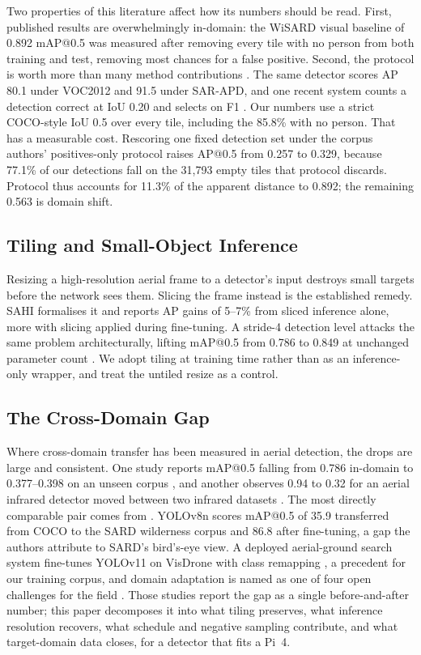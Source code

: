 \documentclass[conference]{IEEEtran}
\begin{document}
Two properties of this literature affect how its numbers should be read. First,
published results are overwhelmingly in-domain: the WiSARD visual baseline of
0.892 mAP@0.5 was measured after removing every tile with no person from both
training and test, removing most chances for a false positive. Second, the
protocol is worth more than many method contributions \cite{manzini2023}. The
same detector scores AP 80.1 under VOC2012 and 91.5 under SAR-APD, and one
recent system counts a detection correct at IoU 0.20 and selects on F1
\cite{fraternali2025}. Our numbers use a strict COCO-style IoU 0.5 over every
tile, including the 85.8\% with no person. That has a measurable cost. Rescoring
one fixed detection set under the corpus authors' positives-only protocol raises
AP@0.5 from 0.257 to 0.329, because 77.1\% of our detections fall on the 31,793
empty tiles that protocol discards. Protocol thus accounts for 11.3\% of the
apparent distance to 0.892; the remaining 0.563 is domain shift.

\subsection{Tiling and Small-Object Inference}

Resizing a high-resolution aerial frame to a detector's input destroys small
targets before the network sees them. Slicing the frame instead is the
established remedy. SAHI \cite{akyon2022} formalises it and reports AP gains of
5--7\% from sliced inference alone, more with slicing applied during
fine-tuning. A stride-4 detection level attacks the same problem
architecturally, lifting mAP@0.5 from 0.786 to 0.849 at unchanged parameter
count \cite{chen2026}. We adopt tiling at training time rather than as an
inference-only wrapper, and treat the untiled resize as a control.

\subsection{The Cross-Domain Gap}

Where cross-domain transfer has been measured in aerial detection, the drops are
large and consistent. One study reports mAP@0.5 falling from 0.786 in-domain to
0.377--0.398 on an unseen corpus \cite{chen2026}, and another observes 0.94 to
0.32 for an aerial infrared detector moved between two infrared datasets
\cite{song2025}. The most directly comparable pair comes from
\cite{sambolek2024}. YOLOv8n scores mAP@0.5 of 35.9 transferred from COCO to the
SARD wilderness corpus and 86.8 after fine-tuning, a gap the authors attribute
to SARD's bird's-eye view. A deployed aerial-ground search system fine-tunes
YOLOv11 on VisDrone with class remapping \cite{farrell2025}, a precedent for our
training corpus, and domain adaptation is named as one of four open challenges
for the field \cite{zhang2025}. Those studies report the gap as a single
before-and-after number; this paper decomposes it into what tiling preserves,
what inference resolution recovers, what schedule and negative sampling
contribute, and what target-domain data closes, for a detector that fits a
Pi~4.
\end{document}
